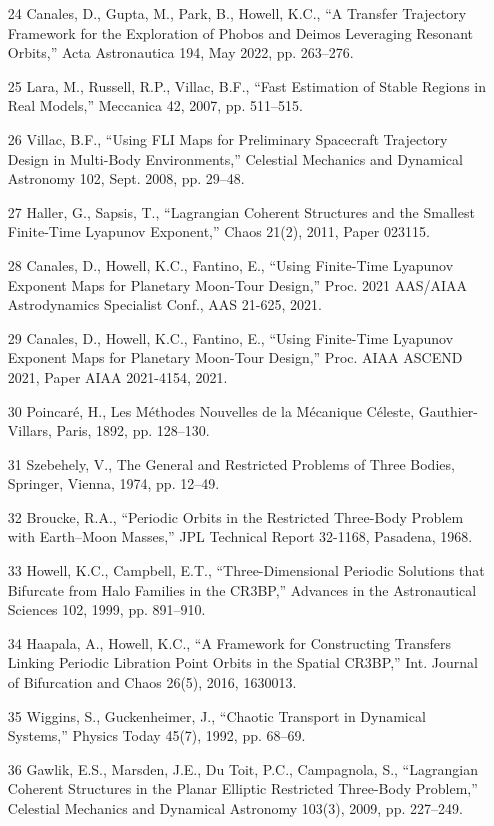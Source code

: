 \documentclass[12pt]{article}
\begin{document}
\begin{enumerate}
\item [24] Canales, D., Gupta, M., Park, B., Howell, K.C., ``A Transfer Trajectory Framework for the Exploration of Phobos and Deimos Leveraging Resonant Orbits,'' Acta Astronautica 194, May 2022, pp. 263--276.
\item [25] Lara, M., Russell, R.P., Villac, B.F., ``Fast Estimation of Stable Regions in Real Models,'' Meccanica 42, 2007, pp. 511--515.
\item [26] Villac, B.F., ``Using FLI Maps for Preliminary Spacecraft Trajectory Design in Multi-Body Environments,'' Celestial Mechanics and Dynamical Astronomy 102, Sept. 2008, pp. 29--48.
\item [27] Haller, G., Sapsis, T., ``Lagrangian Coherent Structures and the Smallest Finite-Time Lyapunov Exponent,'' Chaos 21(2), 2011, Paper 023115.
\item [28] Canales, D., Howell, K.C., Fantino, E., ``Using Finite-Time Lyapunov Exponent Maps for Planetary Moon-Tour Design,'' Proc. 2021 AAS/AIAA Astrodynamics Specialist Conf., AAS 21-625, 2021.
\item [29] Canales, D., Howell, K.C., Fantino, E., ``Using Finite-Time Lyapunov Exponent Maps for Planetary Moon-Tour Design,'' Proc. AIAA ASCEND 2021, Paper AIAA 2021-4154, 2021.
\item [30] Poincaré, H., Les Méthodes Nouvelles de la Mécanique Céleste, Gauthier-Villars, Paris, 1892, pp. 128--130.
\item [31] Szebehely, V., The General and Restricted Problems of Three Bodies, Springer, Vienna, 1974, pp. 12--49.
\item [32] Broucke, R.A., ``Periodic Orbits in the Restricted Three-Body Problem with Earth--Moon Masses,'' JPL Technical Report 32-1168, Pasadena, 1968.
\item [33] Howell, K.C., Campbell, E.T., ``Three-Dimensional Periodic Solutions that Bifurcate from Halo Families in the CR3BP,'' Advances in the Astronautical Sciences 102, 1999, pp. 891--910.
\item [34] Haapala, A., Howell, K.C., ``A Framework for Constructing Transfers Linking Periodic Libration Point Orbits in the Spatial CR3BP,'' Int. Journal of Bifurcation and Chaos 26(5), 2016, 1630013.
\item [35] Wiggins, S., Guckenheimer, J., ``Chaotic Transport in Dynamical Systems,'' Physics Today 45(7), 1992, pp. 68--69.
\item [36] Gawlik, E.S., Marsden, J.E., Du Toit, P.C., Campagnola, S., ``Lagrangian Coherent Structures in the Planar Elliptic Restricted Three-Body Problem,'' Celestial Mechanics and Dynamical Astronomy 103(3), 2009, pp. 227--249.

\end{enumerate}
\end{document}
